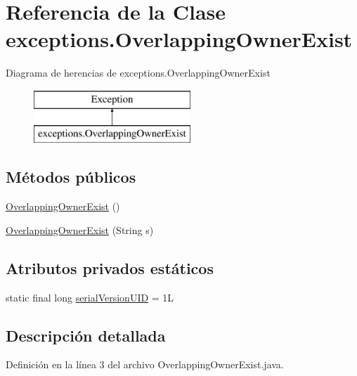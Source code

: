 \hypertarget{classexceptions_1_1_overlapping_owner_exist}{}\section{Referencia de la Clase exceptions.\+Overlapping\+Owner\+Exist}
\label{classexceptions_1_1_overlapping_owner_exist}
Diagrama de herencias de exceptions.\+Overlapping\+Owner\+Exist\begin{figure}[H]
\begin{center}
\leavevmode
\includegraphics[height=2.000000cm]{classexceptions_1_1_overlapping_owner_exist}
\end{center}
\end{figure}
\subsection*{Métodos públicos}
\begin{DoxyCompactItemize}
\item 
\mbox{\hyperlink{classexceptions_1_1_overlapping_owner_exist_a6135a6f0a5fa6f50d1886357e8269d5d}{Overlapping\+Owner\+Exist}} ()
\item 
\mbox{\hyperlink{classexceptions_1_1_overlapping_owner_exist_aec7af33ff914f6c8e4452860bdb3298b}{Overlapping\+Owner\+Exist}} (String s)
\end{DoxyCompactItemize}
\subsection*{Atributos privados estáticos}
\begin{DoxyCompactItemize}
\item 
static final long \mbox{\hyperlink{classexceptions_1_1_overlapping_owner_exist_a6b81e5ae08ae481fc4ca932285ecdac7}{serial\+Version\+U\+ID}} = 1L
\end{DoxyCompactItemize}


\subsection{Descripción detallada}


Definición en la línea 3 del archivo Overlapping\+Owner\+Exist.\+java.




